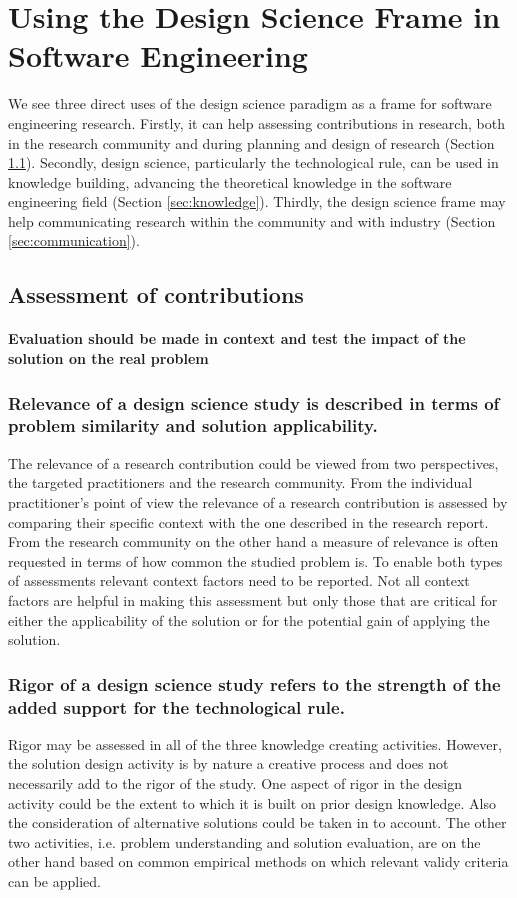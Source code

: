 \documentclass[graybox]{svmult}
\begin{document}
\section{Using the Design Science Frame in Software Engineering}
We see three direct uses of the design science paradigm as a frame for software engineering research. Firstly, it can help assessing contributions in research, both in the research community and during planning and design of research (Section \ref{sec:assessment}). Secondly, design science, particularly the technological rule, can be used in knowledge building, advancing the theoretical knowledge in the software engineering field (Section \ref{sec:knowledge}). Thirdly, the design science frame may help communicating research within the community and with industry (Section \ref{sec:communication}).

\subsection{Assessment of contributions}
\label{sec:assessment}
\paragraph{Evaluation should be made in context and test the impact of the solution on the real problem}

\subsubsection{Relevance of a design science study is described in terms of problem similarity and solution applicability.} The relevance of a research contribution could be viewed from two perspectives, the targeted practitioners and the research community. From the individual practitioner's point of view the relevance of a research contribution is assessed by comparing their specific context with the one described in the research report. From the research community on the other hand a measure of relevance is often requested in terms of how common the studied problem is. To enable both types of assessments relevant context factors need to be reported. Not all context factors are helpful in making this assessment but only those that are critical for either the applicability of the solution or for the potential gain of applying the solution. 


\subsubsection{Rigor of a design science study refers to the strength of the added support for the technological rule.} Rigor may be assessed in all of the three knowledge creating activities. However, the solution design activity is by nature a creative process and does not necessarily add to the rigor of the study. One aspect of rigor in the design activity could be the extent to which it is built on prior design knowledge. Also the consideration of alternative solutions could be taken in to account. The other two activities, i.e. problem understanding and solution evaluation, are on the other hand based on common empirical methods on which relevant validy criteria can be applied. 
\end{document}
